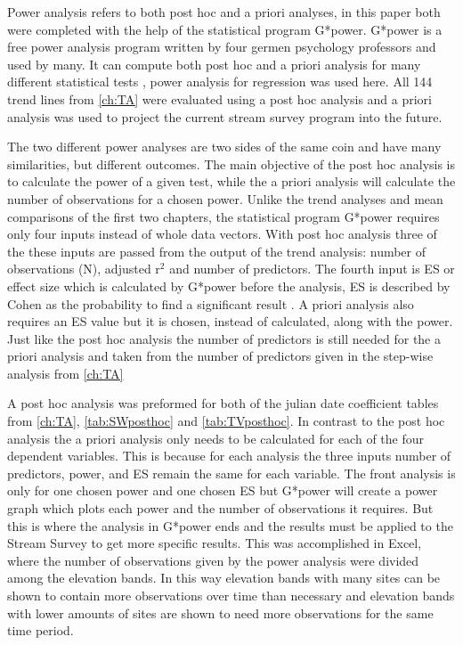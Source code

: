 

Power analysis refers to both  post hoc and a priori analyses, in this paper both were completed with the help of the statistical program G*power.
G*power is a free power analysis program written by four germen psychology professors and used by many.
It can compute both post hoc and a priori analysis for many different statistical tests \citep{faul2009statistical}, power analysis for regression was used here.
All 144 trend lines from \autoref{ch:TA} were evaluated using a post hoc analysis and a priori analysis was used to project the current stream survey program into the future.

The two different power analyses are two sides of the same coin and have many similarities, but different outcomes.
The main objective of the post hoc analysis is to calculate the power of a given test, while the a priori analysis will calculate the number of observations for a chosen power.
Unlike the trend analyses and mean comparisons of the first two chapters, the statistical program G*power requires only four inputs instead of whole data vectors.  
With post hoc analysis three of the these inputs are passed from the output of the trend analysis: number of observations (N), adjusted r$^2$ and number of predictors.
The fourth input is ES or effect size which is calculated by G*power before the analysis, ES is described by Cohen as the probability to find a significant result \citep{cohen1992power}.
A priori analysis also requires an ES value but it is chosen, instead of calculated, along with the power.
Just like the post hoc analysis the number of predictors is still needed for the a priori analysis and taken from the number of predictors given in the step-wise analysis from \autoref{ch:TA}

A post hoc analysis was preformed for both of the julian date coefficient tables from \autoref{ch:TA},  \autoref{tab:SWposthoc} and \autoref{tab:TVposthoc}.
In contrast to the post hoc analysis the a priori analysis only needs to be calculated for each of the four dependent variables.
This is because for each analysis the three inputs number of predictors, power, and ES remain the same for each variable.
The front analysis is only for one chosen power and one chosen ES but G*power will create a power graph which plots each power and the number of observations it requires.
But this is where the analysis in G*power ends and the results must be applied to the Stream Survey to get more specific results.
This was accomplished in Excel, where the number of observations given by the power analysis were divided among the elevation bands.
In this way elevation bands with many sites can be shown to contain more observations over time than necessary and elevation bands with lower amounts of sites are shown to need more observations for the same time period.

